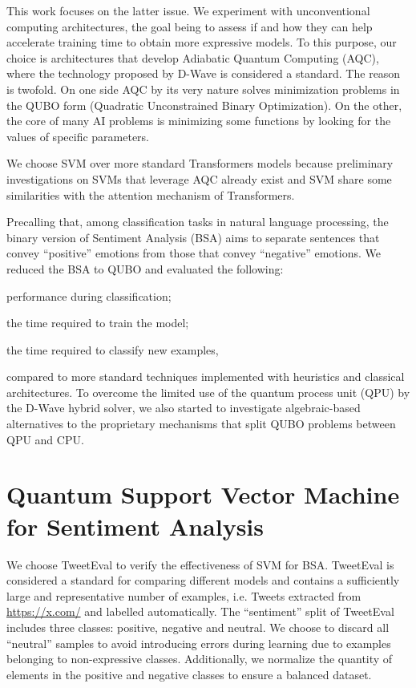 \documentclass{ceurart}
\begin{document}
This work focuses on the latter issue. We experiment with unconventional computing architectures, the goal being to assess if and how they can help accelerate training time to obtain more expressive models. To this purpose, our choice is architectures that develop Adiabatic Quantum Computing (AQC), where the technology proposed by D-Wave is considered a standard. The reason is twofold. On one side AQC by its very nature solves minimization problems in the QUBO form (Quadratic Unconstrained Binary Optimization). On the other, the core of many AI problems is minimizing some functions by looking for the values of specific parameters.

We choose SVM\cite{SVM} over more standard Transformers models because preliminary investigations on SVMs that leverage AQC already exist\cite{QSVM} and SVM share some similarities with the attention mechanism of Transformers\cite{TransformerSVM}.

Precalling that, among classification tasks in natural language processing, the binary version of Sentiment Analysis (BSA) aims to separate sentences that convey ``positive'' emotions from those that convey ``negative'' emotions. We reduced the BSA to QUBO and evaluated the following:
\begin{enumerate*}[label=\arabic*)]
    \item performance during classification;
    \item the time required to train the model;
    \item the time required to classify new examples,
\end{enumerate*}
compared to more standard techniques implemented with heuristics and classical architectures. 
To overcome the limited use of the quantum process unit (QPU) by the D-Wave hybrid solver, we also started to investigate algebraic-based alternatives to the proprietary mechanisms that split QUBO problems between QPU and CPU.

\section{Quantum Support Vector Machine for Sentiment Analysis}

We choose TweetEval\cite{TweetEval} to verify the effectiveness of SVM for BSA. TweetEval is considered a standard for comparing different models and contains a sufficiently large and representative number of examples, i.e. Tweets extracted from \url{https://x.com/} and labelled automatically. The ``sentiment'' split of TweetEval includes three classes: positive, negative and neutral. We choose to discard all ``neutral'' samples to avoid introducing errors during learning due to examples belonging to non-expressive classes. Additionally, we normalize the quantity of elements in the positive and negative classes to ensure a balanced dataset.
\end{document}
